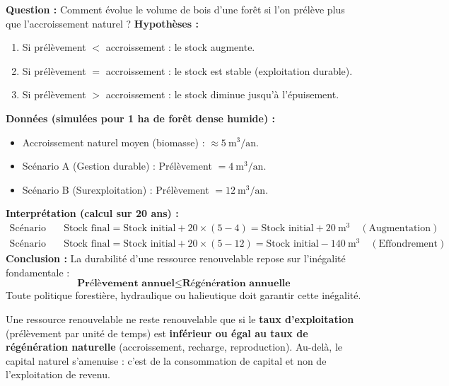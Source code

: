 \documentclass[11pt]{article}
\newcommand{\cle}[1]{{\popxbold\color{popdark}#1}}
\begin{document}
\begin{experience}
\textbf{Question :} Comment évolue le volume de bois d'une forêt si l'on prélève plus que l'accroissement naturel ?
\textbf{Hypothèses :}
\begin{enumerate}
    \item Si prélèvement $<$ accroissement : le stock augmente.
    \item Si prélèvement $=$ accroissement : le stock est stable (exploitation durable).
    \item Si prélèvement $>$ accroissement : le stock diminue jusqu'à l'épuisement.
\end{enumerate}
\textbf{Données (simulées pour 1 ha de forêt dense humide) :}
\begin{itemize}
    \item Accroissement naturel moyen (biomasse) : $\approx 5\ \text{m}^3/\text{an}$.
    \item Scénario A (Gestion durable) : Prélèvement $= 4\ \text{m}^3/\text{an}$.
    \item Scénario B (Surexploitation) : Prélèvement $= 12\ \text{m}^3/\text{an}$.
\end{itemize}
\textbf{Interprétation (calcul sur 20 ans) :}
\begin{align*}
\text{Scénario A :}\quad & \text{Stock final} = \text{Stock initial} + 20 \times (5 - 4) = \text{Stock initial} + 20\ \text{m}^3 \quad (\text{Augmentation}) \\
\text{Scénario B :}\quad & \text{Stock final} = \text{Stock initial} + 20 \times (5 - 12) = \text{Stock initial} - 140\ \text{m}^3 \quad (\text{Effondrement})
\end{align*}
\textbf{Conclusion :} La durabilité d'une ressource renouvelable repose sur l'inégalité fondamentale :
\[
\textbf{Prélèvement annuel} \le \textbf{Régénération annuelle}
\]
Toute politique forestière, hydraulique ou halieutique doit garantir cette inégalité.
\end{experience}

\begin{aretenir}
Une ressource renouvelable ne reste renouvelable que si le \textbf{taux d'exploitation} (prélèvement par unité de temps) est \textbf{inférieur ou égal au taux de régénération naturelle} (accroissement, recharge, reproduction). Au-delà, le capital naturel s'amenuise : c'est de la \cle{consommation de capital} et non de l'exploitation de revenu.
\end{aretenir}
\end{document}
